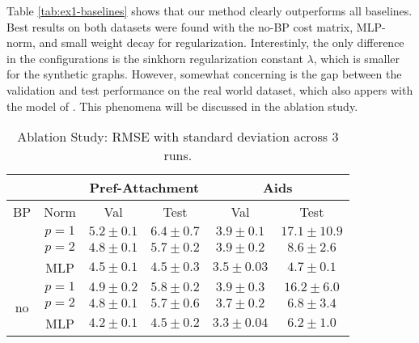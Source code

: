 Table \ref{tab:ex1-baselines} shows that our method clearly outperforms all baselines. Best results on both datasets were found with the no-BP cost matrix, MLP-norm, and small weight decay for regularization. Interestinly, the only difference in the configurations is the  sinkhorn regularization constant $\lambda$, which is smaller for the synthetic graphs. However, somewhat concerning is the gap between the validation and test performance on the real world dataset, which also appers with the model of \cite{bai2019}. This phenomena will be discussed in the ablation study.


\begin{table}[htbp]
    \addtolength{\tabcolsep}{-1pt}
    \fontsize{9pt}{10.25pt}\selectfont
    \centering
    \renewcommand{\arraystretch}{1.2}
    \begin{tabular}{|c|c|c|c|c|c|}
        \hline
        \multicolumn{2}{|c|}{} & \multicolumn{2}{c|}{Pref-Attachment} & \multicolumn{2}{c|}{Aids} \\ \hline
        BP & Norm & Val & Test & Val & Test \\ \hhline{|=|=|=|=|=|=|}
        \multirow{3}{*}{yes} & $p=1$ & $5.2 \pm 0.1$ & $6.4 \pm 0.7$ & $3.9 \pm 0.1$ & $17.1 \pm 10.9$ \\ \hhline{|~|-|-|-|-|-|}
        & $p=2$ & $4.8 \pm 0.1$ & $5.7 \pm 0.2$ & $3.9 \pm 0.2$ & $8.6 \pm 2.6$ \\ \hhline{|~|-|-|-|-|-|}
        & MLP & $4.5 \pm 0.1$ & $\boldsymbol{4.5 \pm 0.3}$ & $3.5 \pm 0.03$ & $\boldsymbol{4.7 \pm 0.1}$ \\ \hline
        \multirow{3}{*}{no}  & $p=1$ & $4.9 \pm 0.2$ & $5.8 \pm 0.2$ & $3.9 \pm 0.3$ & $16.2 \pm 6.0$ \\ \hhline{|~|-|-|-|-|-|}
        & $p=2$ & $4.8 \pm 0.1$ & $5.7 \pm 0.6$ & $3.7 \pm 0.2$ & $6.8 \pm 3.4$ \\ \hhline{|~|-|-|-|-|-|}
        & MLP & $4.2 \pm 0.1$ & $\boldsymbol{4.5 \pm 0.2}$ & $3.3 \pm 0.04$ & $6.2 \pm 1.0$ \\ \hline
    \end{tabular}
    \caption{Ablation Study: RMSE with standard deviation across 3 runs.}
    \label{tab:ex1-ablation}
\end{table}


